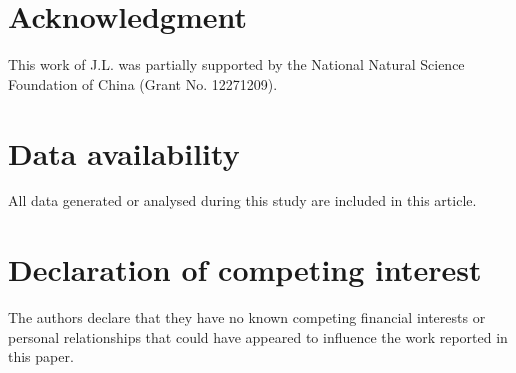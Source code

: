 \documentclass[final,3p,times]{elsarticle}
\begin{document}


\section*{Acknowledgment}
This work of J.L. was partially supported by the National Natural Science Foundation of China (Grant No. 12271209).

\section*{Data availability}
All data generated or analysed during this study are included in this article.

\section*{Declaration of competing interest}
The authors declare that they have no known competing financial interests or personal relationships that could have appeared to influence the work reported in this paper.
\end{document}
